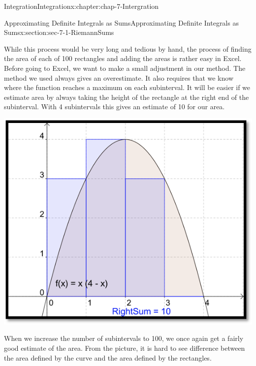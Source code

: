 \documentclass[oneside,10pt,]{book}
\numberwithin{equation}{section}
\begin{document}
\begin{chapterptx}{Integration}{}{Integration}{}{}{x:chapter:chap-7-Intergration}
\begin{sectionptx}{Approximating Definite Integrals as Sums}{}{Approximating Definite Integrals as Sums}{}{}{x:section:sec-7-1-RiemannSums}
\begin{sidebyside}{1}{0.2}{0.2}{0}
\begin{sbspanel}{0.6}
\end{sbspanel}%
\end{sidebyside}%
\par
While this process would be very long and tedious by hand, the process of finding the area of each of 100 rectangles and adding the areas is rather easy in Excel.  Before going to Excel, we want to make a small adjustment in our method.  The method we used always gives an overestimate.  It also requires that we know where the function reaches a maximum on each subinterval.  It will be easier if we estimate area by always taking the height of the rectangle at the right end of the subinterval.  With 4 subintervals this gives an estimate of 10 for our area.%
\begin{sidebyside}{1}{0.2}{0.2}{0}%
\begin{sbspanel}{0.6}%
\includegraphics[width=\linewidth]{images/sec7-1-7.png}
\end{sbspanel}%
\end{sidebyside}%
\par
When we increase the number of subintervals to 100, we once again get a fairly good estimate of the area.  From the picture, it is hard to see difference between the area defined by the curve and the area defined by the rectangles.%
\begin{sidebyside}{1}{0.2}{0.2}{0}%
\begin{sbspanel}{0.6}%

\end{sbspanel}
\end{sidebyside}
\end{sectionptx}
\end{chapterptx}
\end{document}
